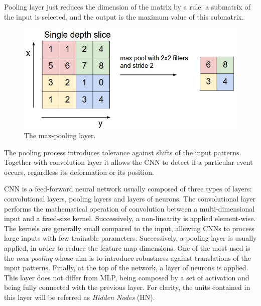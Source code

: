 \begin{enumerate}
Pooling layer just reduces the dimension of the matrix by a rule: a submatrix of the input is selected, and the output is the maximum value of this submatrix.
	
	\begin{figure}
		\centering
		\includegraphics[width=0.6\columnwidth]{img/maxpool.jpeg}
		\caption{The max-pooling layer.}
	\end{figure}

The pooling process introduces tolerance against shifts of the input patterns. Together with convolution layer it allows the CNN to detect if a particular event occurs, regardless its deformation or its position.

CNN is a feed-forward neural network \cite{726791} usually composed of three types of layers: convolutional layers, pooling layers and layers of neurons.
The convolutional layer performs the mathematical operation of convolution between a multi-dimensional input and a fixed-size kernel. Successively, a non-linearity is applied element-wise. 
The kernels are generally small compared to the input, allowing CNNs to process large inputs with few trainable parameters.
Successively, a pooling layer is usually applied, in order to reduce the feature map dimensions. One of the most used is the \textit{max-pooling} whose aim is to introduce robustness against translations of the input patterns.
Finally, at the top of the network, a layer of neurons is applied. This layer does not differ from MLP, being composed by a set of activation and being fully connected with the previous layer. For clarity, the units contained in this layer will be referred as \textit{Hidden Nodes} (HN).


\end{enumerate}

